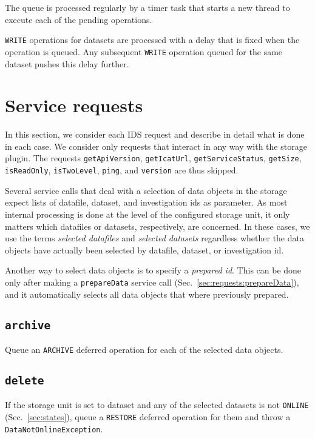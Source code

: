 \documentclass[paper=a4]{scrartcl}
\begin{document}
The queue is processed regularly by a timer task that starts a new
thread to execute each of the pending operations.

\texttt{WRITE} operations for datasets are processed with a delay
that is fixed when the operation is queued.  Any subsequent
\texttt{WRITE} operation queued for the same dataset pushes this
delay further.


\section{Service requests}
\label{sec:requests}

In this section, we consider each IDS request and describe in detail
what is done in each case.  We consider only requests that interact in
any way with the storage plugin.  The requests \texttt{getApiVersion},
\texttt{getIcatUrl}, \texttt{getServiceStatus}, \texttt{getSize},
\texttt{isReadOnly}, \texttt{isTwoLevel}, \texttt{ping}, and
\texttt{version} are thus skipped.

Several service calls that deal with a selection of data objects in
the storage expect lists of datafile, dataset, and investigation ids
as parameter.  As most internal processing is done at the level of the
configured storage unit, it only matters which datafiles or datasets,
respectively, are concerned.  In these cases, we use the terms
\emph{selected datafiles} and \emph{selected datasets} regardless
whether the data objects have actually been selected by datafile,
dataset, or investigation id.

Another way to select data objects is to specify a
\emph{prepared id}.  This can be done only after making a
\texttt{prepareData} service call
(Sec.\ \ref{sec:requests:prepareData}), and it automatically
selects all data objects that where previously prepared.

\subsection{\texttt{archive}}

Queue an \texttt{ARCHIVE} deferred operation for each of the selected
data objects.

\subsection{\texttt{delete}}
\label{sec:requests:delete}

If the storage unit is set to dataset and any of the selected
datasets is not \texttt{ONLINE} (Sec.\ \ref{sec:states}), queue a
\texttt{RESTORE} deferred operation for them and throw a
\texttt{DataNotOnlineException}.
\end{document}
